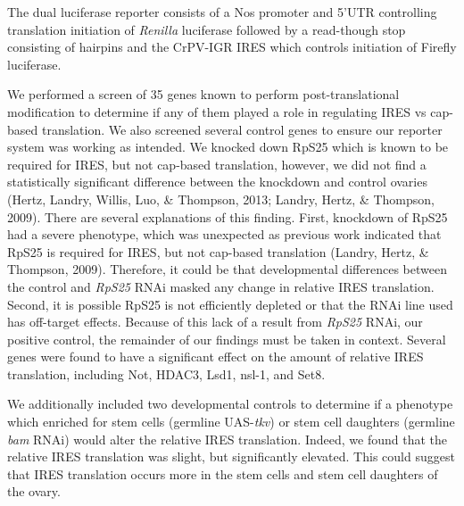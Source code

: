 \documentclass[12pt,oneside]{reedthesis}
\begin{document}
\setlength\parindent{0pt}The dual luciferase reporter consists of a Nos promoter and 5'UTR controlling translation initiation of \emph{Renilla} luciferase followed by a read-though stop consisting of hairpins and the CrPV-IGR IRES which controls initiation of Firefly luciferase.

\setlength\parindent{24pt}

We performed a screen of 35 genes known to perform post-translational
modification to determine if any of them played a role in regulating
IRES vs cap-based translation. We also screened several control genes to
ensure our reporter system was working as intended. We knocked down
RpS25 which is known to be required for IRES, but not cap-based
translation, however, we did not find a statistically significant
difference between the knockdown and control ovaries
(Hertz, Landry, Willis, Luo, \& Thompson, 2013; Landry, Hertz, \& Thompson, 2009). There are several
explanations of this finding. First, knockdown of RpS25 had a severe
phenotype, which was unexpected as previous work indicated that RpS25 is
required for IRES, but not cap-based translation
(Landry, Hertz, \& Thompson, 2009). Therefore, it could be that
developmental differences between the control and \emph{RpS25} RNAi masked any
change in relative IRES translation. Second, it is possible RpS25 is not
efficiently depleted or that the RNAi line used has off-target effects.
Because of this lack of a result from \emph{RpS25} RNAi, our positive control,
the remainder of our findings must be taken in context. Several genes
were found to have a significant effect on the amount of relative IRES
translation, including Not, HDAC3, Lsd1, nsl-1, and Set8.

We additionally included two developmental controls to determine if a
phenotype which enriched for stem cells (germline UAS-\emph{tkv}) or stem cell
daughters (germline \emph{bam} RNAi) would alter the relative IRES translation.
Indeed, we found that the relative IRES translation was slight, but
significantly elevated. This could suggest that IRES translation occurs
more in the stem cells and stem cell daughters of the ovary.
\end{document}
